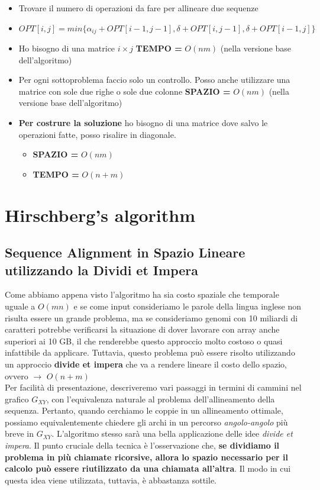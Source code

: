 \begin{itemize}
  \item
        Trovare il numero di operazioni da fare per allineare due sequenze
  \item
        $OPT[i,j] = min\{ \alpha_{ij} + OPT[i-1,j-1], \delta + OPT[i, j-1], \delta + OPT[i-1, j] \}$
  \item
        Ho bisogno di una matrice $i \times j$ \textbf{TEMPO =} $O(nm)$
        (nella versione base dell'algoritmo)
  \item
        Per ogni sottoproblema faccio solo un controllo. Posso anche
        utilizzare una matrice con sole due righe o sole due colonne
        \textbf{SPAZIO =} $O(nm)$ (nella versione base dell'algoritmo)
  \item
        \textbf{Per costrure la soluzione} ho bisogno di una matrice dove
        salvo le operazioni fatte, posso risalire in diagonale.

        \begin{itemize}
          \item
                \textbf{SPAZIO =} $O(nm)$
          \item
                \textbf{TEMPO =} $O(n+m)$
        \end{itemize}
\end{itemize}

\section{Hirschberg's algorithm}

\subsection{Sequence Alignment in Spazio Lineare utilizzando la Dividi et Impera}

Come abbiamo appena visto l'algoritmo ha sia costo spaziale che
temporale uguale a $O(mn)$ e se come input consideriamo le parole
della lingua inglese non risulta essere un grande problema, ma se
consideriamo genomi con 10 miliardi di caratteri potrebbe verificarsi la
situazione di dover lavorare con array anche superiori ai 10 GB, il che
renderebbe questo approccio molto costoso o quasi infattibile da
applicare. Tuttavia, questo problema può essere risolto utilizzando un
approccio \textbf{divide et impera} che va a rendere lineare il costo
dello spazio, ovvero $\rightarrow$ $O(n + m)$\\

Per facilità di presentazione, descriveremo vari passaggi in termini di
cammini nel grafico $G_{XY}$, con l'equivalenza naturale al problema
dell'allineamento della sequenza. Pertanto, quando cerchiamo le coppie
in un allineamento ottimale, possiamo equivalentemente chiedere gli
archi in un percorso \emph{angolo-angolo} più breve in $G_{XY}$.
L'algoritmo stesso sarà una bella applicazione delle idee \emph{divide
  et impera}. Il punto cruciale della tecnica è l'osservazione che,
\textbf{se dividiamo il problema in più chiamate ricorsive, allora lo
  spazio necessario per il calcolo può essere riutilizzato da una chiamata
  all'altra}. Il modo in cui questa idea viene utilizzata, tuttavia, è
abbastanza sottile.

